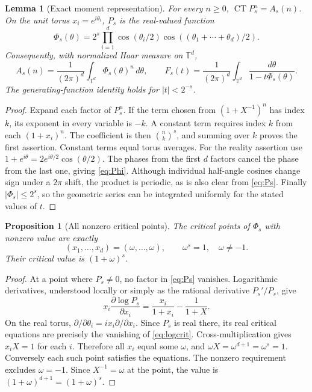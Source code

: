 \documentclass[11pt,a4paper]{article}
\newtheorem{lemma}[theorem]{Lemma}
\newtheorem{proposition}[theorem]{Proposition}
\theoremstyle{definition}\newtheorem{definition}[theorem]{Definition}
\theoremstyle{remark}\newtheorem{remark}[theorem]{Remark}
\newcommand{\CT}{\operatorname{CT}}
\begin{document}
\begin{lemma}[Exact moment representation]\label{lem:CT}
For every $n\ge0$, $\CT P_s^n=A_s(n)$. On the unit torus $x_i=e^{i\theta_i}$,
$P_s$ is the real-valued function
\begin{equation}\label{eq:Phi}
 \Phi_s(\theta)=2^s\prod_{i=1}^{d}\cos(\theta_i/2)
                   \cos((\theta_1+\cdots+\theta_d)/2).
\end{equation}
Consequently, with normalized Haar measure on $\mathbb T^d$,
\[
 A_s(n)=\frac1{(2\pi)^d}\int_{\mathbb T^d}\Phi_s(\theta)^n\,d\theta,
 \qquad
 F_s(t)=\frac1{(2\pi)^d}\int_{\mathbb T^d}
              \frac{d\theta}{1-t\Phi_s(\theta)}.
\]
The generating-function identity holds for $|t|<2^{-s}$.
\end{lemma}
\begin{proof}
Expand each factor of $P_s^n$. If the term chosen from $(1+X^{-1})^n$ has
index $k$, its exponent in every variable is $-k$. A constant term requires
index $k$ from each $(1+x_i)^n$. The coefficient is then $\binom nk^s$, and
summing over $k$ proves the first assertion. Constant terms equal torus averages.
For the reality assertion use
$1+e^{i\theta}=2e^{i\theta/2}\cos(\theta/2)$. The phases from the first $d$
factors cancel the phase from the last one, giving \eqref{eq:Phi}.
Although individual half-angle cosines change sign under a $2\pi$ shift,
the product is periodic, as is also clear from \eqref{eq:Ps}.
Finally $|\Phi_s|\le2^s$, so the geometric series can be integrated uniformly
for the stated values of $t$.
\end{proof}

\begin{proposition}[All nonzero critical points]\label{prop:crit}
The critical points of $\Phi_s$ with nonzero value are exactly
\[
 (x_1,\ldots,x_d)=(\omega,\ldots,\omega),\qquad
 \omega^s=1,\quad\omega\ne-1.
\]
Their critical value is $(1+\omega)^s$.
\end{proposition}
\begin{proof}
At a point where $P_s\ne0$, no factor in \eqref{eq:Ps} vanishes. Logarithmic
derivatives, understood locally or simply as the rational derivative $P_s'/P_s$,
give
\begin{equation}\label{eq:logcrit}
 x_i\frac{\partial\log P_s}{\partial x_i}
       =\frac{x_i}{1+x_i}-\frac1{1+X}.
\end{equation}
On the real torus, $\partial/\partial\theta_i=i x_i\partial/\partial x_i$.
Since $P_s$ is real there, its real critical equations are precisely the
vanishing of \eqref{eq:logcrit}. Cross-multiplication gives $x_iX=1$ for each
$i$. Therefore all $x_i$ equal some $\omega$, and
$\omega X=\omega^{d+1}=\omega^s=1$.
Conversely each such point satisfies the equations. The nonzero requirement
excludes $\omega=-1$. Since $X^{-1}=\omega$ at the point, the value is
$(1+\omega)^{d+1}=(1+\omega)^s$.
\end{proof}
\end{document}
